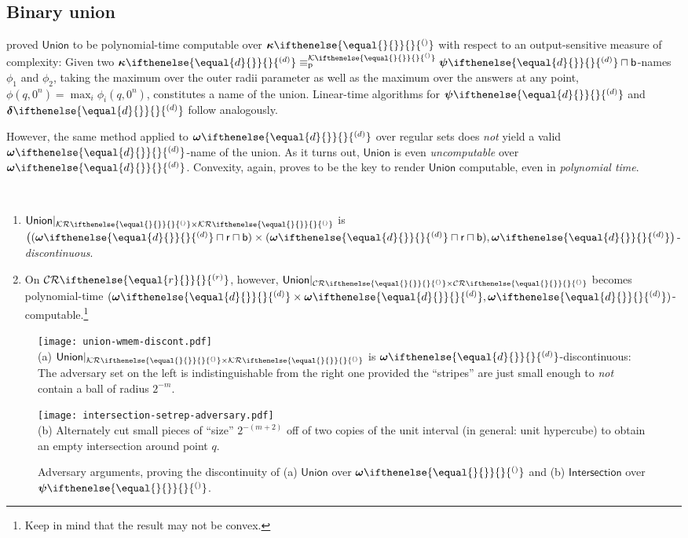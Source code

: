 \documentclass{CSML}
\newcommand{\setTypes}[2]{ \mathcal{#1}\ifnotempty{#2}{^{(#2)}} }
\newcommand{\representation}[2]{ #1\ifnotempty{#2}{^{(#2)}} }
\newcommand{\distrep}[1][\empty]{ \representation{\bm{\delta}}{#1} }
\newcommand{\setrep}[1][\empty]{ \representation{\bm{\psi}}{#1} }
\newcommand{\gridrep}[1][\empty]{ \representation{\bm{\kappa}}{#1} }
\newcommand{\wmemrep}[1][\empty]{ \representation{\bm{\omega}}{#1} }
\newcommand{\compset}[1][\empty]{ \representation{\mathcal{K}}{#1} }
\newcommand{\ifnotempty}[2]{ \ifthenelse{ \equal{#1}{\empty} }{}{#2} }
\newcommand{\CR}[1][\empty]{\setTypes{CR}{#1}}
\newcommand{\KR}[1][\empty]{\setTypes{KR}{#1}}
\newcommand{\cb}{\CR}   %
\newcommand{\pequiv}{\equiv_\mathrm{p}}
\newcommand{\wrt}{with respect to\xspace}
\newcommand{\enp}[1]{\sqcap \mathsf{#1}}
\newcommand{\dsocap}{\mathsf{Intersection}}
\newcommand{\dsocup}{\mathsf{Union}}
\begin{document}
\subsection{Binary union}


\cite[Lem.~2.7]{ZM08} proved $\dsocup$ to be polynomial-time computable over
$\gridrep$ \wrt an output-sensitive measure of complexity:
Given two $\gridrep[d] \pequiv^{\compset} \setrep[d] \enp{b}$-names
$\phi_1$ and $\phi_2$, taking the maximum over the outer radii parameter as
well as the maximum over the answers at any point,
$\phi(q,0^n) = \max_i \phi_i(q,0^n)$, constitutes a name of the union.
Linear-time algorithms for $\setrep[d]$ and $\distrep[d]$ follow analogously.

However, the same method applied to $\wmemrep[d]$ over regular sets does
\emph{not} yield a valid $\wmemrep[d]$-name of the union.
As it turns out, $\dsocup$ is even \emph{uncomputable} over $\wmemrep[d]$.
Convexity, again, proves to be the key to render $\dsocup$ computable,
even in \emph{polynomial time}.

\begin{thm}\ %
\begin{enumerate}
\item $\dsocup|_{\KR \times \KR}$ is
	$\big((\wmemrep[d] \enp{r} \enp{b}) \times (\wmemrep[d] \enp{r} \enp{b}),
   	\wmemrep[d]\big)$-\emph{discontinuous}.
\item On $\cb[r]$, however, $\dsocup|_{\cb \times \cb}$
	becomes polynomial-time
	$(\wmemrep[d] \times \wmemrep[d], \wmemrep[d])$-computable.\footnote{%
		Keep in mind that the result may not be convex.
	}
\end{enumerate}
\end{thm}

\begin{figure}
   \centering
	\begin{minipage}[t]{0.46\textwidth}
		\texttt{[image: union-wmem-discont.pdf]}\\
		\small (a)
        $\dsocup|_{\KR \times \KR}$ is $\wmemrep[d]$-discontinuous:
        The adversary set on the left is indistinguishable from the right one
		provided the ``stripes'' are just small enough to \emph{not} contain a
		ball of radius $2^{-m}$.
      \end{minipage}
	\qquad
    \begin{minipage}[t]{0.42\textwidth}
      \texttt{[image: intersection-setrep-adversary.pdf]}\\
      \small
      (b) Alternately cut small pieces of ``size''
		$2^{-(m+2)}$ off of two copies of the unit interval (in general:
		unit hypercube) to obtain an empty intersection around point $q$.
      \end{minipage}
	\caption{Adversary arguments, proving the discontinuity of
      (a) $\dsocup$ over $\wmemrep$ and (b) $\dsocap$ over $\setrep$.}
    \label{fig:union-wmem-disc-and-intersection-setrep-adv}
\end{figure}
\end{document}
